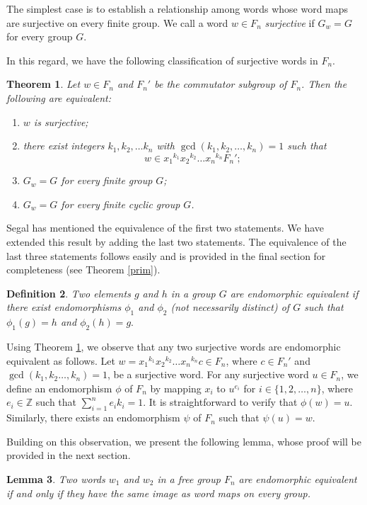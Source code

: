 \documentclass[12pt]{amsart}
\newtheorem{theorem}{Theorem}[section]
\newtheorem{lemma}[theorem]{Lemma}
\newtheorem{definition}[theorem]{Definition}
\begin{document}
The simplest case is to establish a relationship among words whose word maps are surjective on every finite group. We call a word $w \in F_n$ \textit{surjective} if $G_w = G$ for every group $G$. 

In this regard, we have the following classification of surjective words in $F_n$.
\begin{theorem}\cite[Theorem~3.1.1]{segal2009words}\label{segal}
    Let $w \in F_n$ and $F_n'$ be the commutator subgroup of $F_n$. Then the following are equivalent:
    \begin{enumerate}
        \item $w$ is surjective;
        \item there exist integers $k_1, k_2, \ldots k_n$ with $\gcd(k_1, k_2, \ldots, k_n) = 1$ such that $$w \in {x_1}^{k_1}{x_2}^{k_2}\ldots {x_n}^{k_n}{F_n}';$$
        \item $G_w = G$ for every finite group $G$;
        \item $G_w = G$ for every finite cyclic group $G$.
    \end{enumerate}
\end{theorem}
Segal has mentioned the equivalence of the first two statements. We have extended this result by adding the last two statements. The equivalence of the last three statements follows easily and is provided in the final section for completeness (see Theorem \ref{prim}).
\begin{definition}\label{def_end}
    Two elements $g$ and $h$ in a group $G$ are endomorphic equivalent if there exist  endomorphisms $\phi_1$ and $\phi_2$ (not necessarily distinct) of $G$ such that $\phi_1(g) = h$ and $\phi_2(h) = g.$ 
\end{definition}

Using Theorem \ref{segal}, we observe that any two surjective words are endomorphic equivalent as follows. Let $w = {x_1}^{k_1}{x_2}^{k_2}\ldots {x_n}^{k_n}c \in F_n$, where $c \in F_n'$ and $\gcd(k_1,k_2\ldots,k_n)=1$, be a surjective word. For any surjective word $u \in F_n$, we define an endomorphism $\phi$ of $F_n$ by mapping $x_i$ to ${u}^{e_i}$ for $i \in \{1,2,\ldots, n\}$, where $e_i \in \mathbb{Z}$ such that $\sum_{i=1}^ne_ik_i = 1$. It is straightforward to verify that $\phi(w) = u$. Similarly, there exists an endomorphism $\psi$ of $F_n$ such that $\psi(u) = w$.

Building on this observation, we present the following lemma, whose proof will be provided in the next section.

\begin{lemma}\label{endoequi}
    Two words $w_1$ and $w_2$ in a free group $F_n$ are endomorphic equivalent if and only if they have the same image as word maps on every group. 
\end{lemma}
\end{document}
